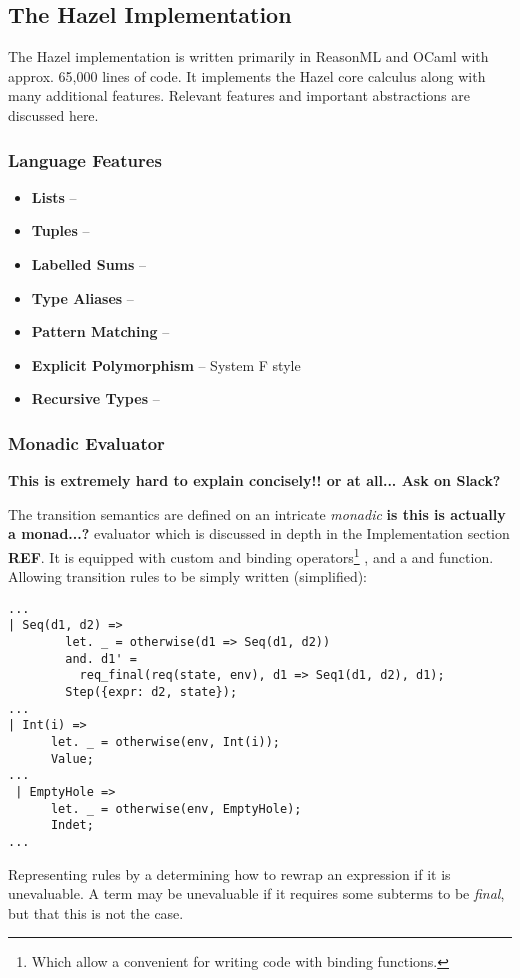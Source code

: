 \subsection{The Hazel Implementation}
The Hazel implementation \cite{HazelCode} is written primarily in ReasonML and OCaml with approx. 65,000 lines of code. It implements the Hazel core calculus along with many additional features. Relevant features and important abstractions are discussed here.

\subsubsection{Language Features}
\begin{itemize}
\item \textbf{Lists} -- 
\item \textbf{Tuples} -- 
\item \textbf{Labelled Sums} -- 
\item \textbf{Type Aliases} -- 
\item \textbf{Pattern Matching} -- 
\item \textbf{Explicit Polymorphism} -- System F style
\item \textbf{Recursive Types} -- 
\end{itemize}

\subsubsection{Monadic Evaluator}
\textbf{This is extremely hard to explain concisely!! or at all... Ask on Slack?}

The transition semantics are defined on an intricate \textit{monadic} \textbf{is this is actually a monad...?} evaluator which is discussed in depth in the Implementation section \textbf{REF}. It is equipped with custom  and  binding operators\footnote{Which allow a convenient for writing code with binding functions.} \cite{OCamlManual}, and a  and  function. Allowing transition rules to be simply written (simplified):
\begin{verbatim}
...
| Seq(d1, d2) =>
        let. _ = otherwise(d1 => Seq(d1, d2))
        and. d1' = 
          req_final(req(state, env), d1 => Seq1(d1, d2), d1);
        Step({expr: d2, state});
...
| Int(i) =>
      let. _ = otherwise(env, Int(i));
      Value;
...
 | EmptyHole =>
      let. _ = otherwise(env, EmptyHole);
      Indet;
...
\end{verbatim}
Representing rules by a  determining how to rewrap an expression if it is unevaluable. A term may be unevaluable if it requires some subterms to be \textit{final}, but that this is not the case. 

